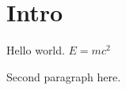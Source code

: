 \documentclass{article}
\begin{document}
\section{Intro}
Hello world. $E=mc^2$

Second paragraph here.
\end{document}
